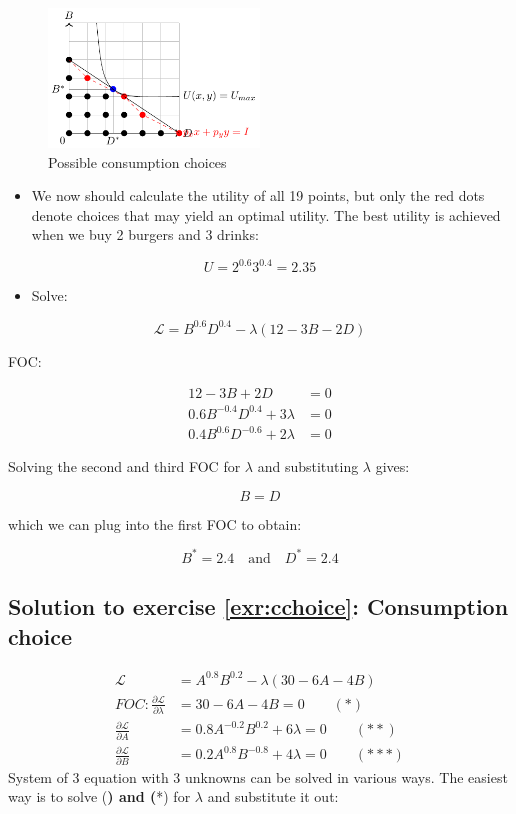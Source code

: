 \documentclass[
  12pt,
  oneside]{book}
\providecommand{\tightlist}{%
  \setlength{\itemsep}{0pt}\setlength{\parskip}{0pt}}
\theoremstyle{definition}
\theoremstyle{definition}
\theoremstyle{definition}
\theoremstyle{definition}
\theoremstyle{remark}
\begin{document}
\begin{figure}
\centering
\includegraphics[width=0.5\textwidth,height=\textheight]{fig/burgerutility.png}
\caption{\label{fig:burgerutility2} Possible consumption choices}
\end{figure}

\begin{itemize}
\tightlist
\item
  We now should calculate the utility of all 19 points, but only the red dots denote choices that may yield an optimal utility. The best utility is achieved when we buy 2 burgers and 3 drinks:
\end{itemize}

\[U=2^{0.6}3^{0.4}=2.35\]

\begin{itemize}
\tightlist
\item
  Solve:
\end{itemize}

\[
\mathcal{L}=B^{0.6}D^{0.4}-\lambda(12-3B-2D)
\]

FOC:

\begin{align*}
12-3B+2D&=0\\
0.6B^{-0.4}D^{0.4}+3\lambda&=0\\
0.4B^{0.6}D^{-0.6}+2\lambda&=0
\end{align*}

Solving the second and third FOC for \(\lambda\) and substituting \(\lambda\) gives:

\[B=D\]

which we can plug into the first FOC to obtain:

\[B^*=2.4 \quad \text{and} \quad D^*=2.4\]

\hypertarget{sol:cchoice}{%
\subsection*{Solution to exercise \ref{exr:cchoice}: Consumption choice}\label{sol:cchoice}}

\begin{align*}
\mathcal{L}&=A^{0.8}B^{0.2}-\lambda(30-6A-4B)\\
FOC: \frac{\partial \mathcal{L}}{\partial \lambda}&=30-6A-4B=0 \qquad (*)\\
\frac{\partial \mathcal{L}}{\partial A}&=0.8A^{-0.2}B^{0.2}+6\lambda=0 \qquad (**)\\
\frac{\partial \mathcal{L}}{\partial B}&=0.2A^{0.8}B^{-0.8}+4\lambda=0 \qquad (***)
\end{align*}
System of 3 equation with 3 unknowns can be solved in various ways.
The easiest way is to solve (\textbf{) and (}*) for \(\lambda\) and substitute it out:
\end{document}
